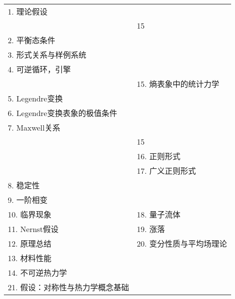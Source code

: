 \newpage
{{

\centering
\begin{tabular}{ll}
1. 理论假设 & \\
 & 15 \\
2. 平衡态条件 & \\
3. 形式关系与样例系统 & \\
4. 可逆循环，引擎 & \\
 & 15. 熵表象中的统计力学 \\
5. Legendre变换 & \\
6. Legendre变换表象的极值条件 & \\
7. Maxwell关系 & \\
 & 15 \\
 & 16. 正则形式 \\
 & 17. 广义正则形式 \\
8. 稳定性 & \\
9. 一阶相变 & \\
\hline
10. 临界现象 & 18. 量子流体 \\
11. Nernst假设 & 19. 涨落 \\
12. 原理总结 & 20. 变分性质与平均场理论 \\
13. 材料性能 & \\
14. 不可逆热力学 & \\
\hline
21. 假设：对称性与热力学概念基础
\end{tabular}
}}